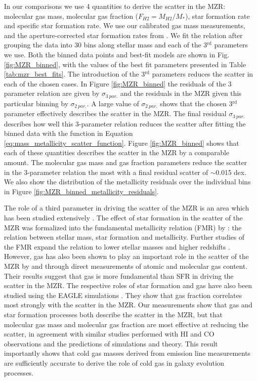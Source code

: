 \documentclass[fleqn,usenatbib]{mnras}
\begin{document}
In our comparisons we use 4 quantities to derive the scatter in the MZR: molecular gas mass, molecular gas fraction ($F_{H2} = M_{H2}/M_{*}$), star formation rate and specific star formation rate. We use our calibrated gas mass measurements, and the aperture-corrected star formation rates from \cite{brinchmann2004}. We fit the relation after grouping the data into 30 bins along stellar mass and each of the 3$^{\textrm{rd}}$ parameters we use. Both the binned data points and best-fit models are shown in Fig. \ref{fig:MZR_binned}, with the values of the best fit parameters presented in Table \ref{tab:mzr_best_fits}. The introduction of the 3$^{\textrm{rd}}$ parameters reduces the scatter in each of the chosen cases. In Figure \ref{fig:MZR_binned} the residuals of the 3 parameter relation are given by $\sigma_{3\: par.}$ and the residuals in the MZR given this particular binning by $\sigma_{2\: par.}$. 
A large value of $\sigma_{2\: par.}$ shows that the chosen 3$^{\textrm{rd}}$ parameter effectively describes the scatter in the MZR. The final residual $\sigma_{3\: par.}$ describes how well this 3-parameter relation reduces the scatter after fitting the binned data with the function in Equation \ref{eq:mass_metallicity_scatter_function}. Figure \ref{fig:MZR_binned} shows that each of these quantities describes the scatter in the MZR by a comparable amount. The molecular gas mass and gas fraction parameters reduce the scatter in the 3-parameter relation the most with a final residual scatter of $\sim$0.015 dex. We also show the distribution of the metallicity residuals over the individual bins in Figure \ref{fig:MZR_binned_metallicity_residuals}. 

The role of a third parameter in driving the scatter of the MZR is an area which has been studied extensively \citep[e.g.][]{ellison2008}. The effect of star formation in the scatter of the MZR was formalized into the fundamental metallicity relation (FMR) by \cite{mannucci2010}: the relation between stellar mass, star formation and metallicity. Further studies of the FMR expand the relation to lower stellar masses and higher redshifts \citep{mannucci2011, cresci2019, curti2020}. However, gas has also been shown to play an important role in the scatter of the MZR by \cite{bothwell2013, bothwell2016, lara-lopez2013, hughes2013} and \cite{brown2018} through direct measurements of atomic and molecular gas content. Their results suggest that gas is more fundamental than SFR in  driving the scatter in the MZR. The respective roles of star formation and gas have also been studied using the EAGLE simulations \citep{loon2021}. They show that gas fraction correlates most strongly with the scatter in the MZR. Our measurements show that gas and star formation processes both describe the scatter in the MZR, but that molecular gas mass and molecular gas fraction are most effective at reducing the scatter, in agreement with similar studies performed with HI and CO observations and the predictions of simulations and theory. 
This result importantly shows that cold gas masses derived from emission line measurements are sufficiently accurate to derive the role of cold gas in galaxy evolution processes. 
\end{document}
